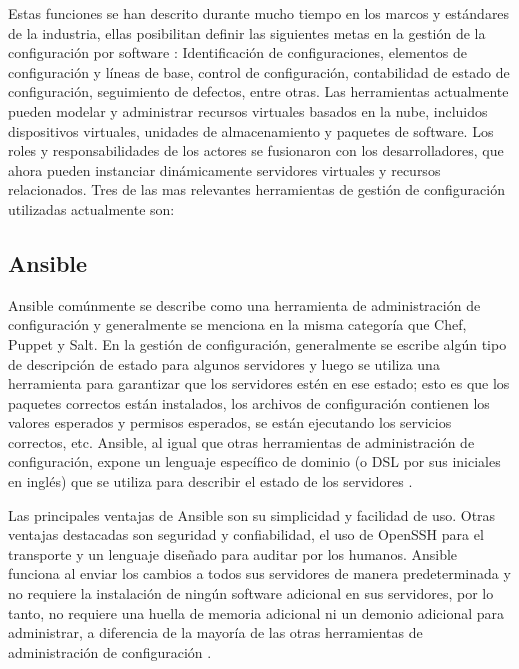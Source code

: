 \par Estas funciones se han descrito durante mucho tiempo en los marcos y estándares de la industria, ellas posibilitan definir las siguientes metas en la gestión de la configuración por software \cite{BOOK14}: Identificación de configuraciones, elementos de configuración y líneas de base, control de configuración, contabilidad de estado de configuración, seguimiento de defectos, entre otras. Las herramientas actualmente pueden modelar y administrar recursos virtuales basados en la nube, incluidos dispositivos virtuales, unidades de almacenamiento y paquetes de software. Los roles y responsabilidades de los actores se fusionaron con los desarrolladores, que ahora pueden instanciar dinámicamente servidores virtuales y recursos relacionados. Tres de las mas relevantes herramientas de gestión de configuración utilizadas actualmente son:
\subsection{Ansible}

\par Ansible comúnmente se describe como una herramienta de administración de configuración y generalmente se menciona en la misma categoría que Chef, Puppet y Salt. En la gestión de configuración, generalmente se escribe algún tipo de descripción de estado para algunos servidores y luego se utiliza una herramienta para garantizar que los servidores estén en ese estado; esto es que los paquetes correctos están instalados, los archivos de configuración contienen los valores esperados y permisos esperados, se están ejecutando los servicios correctos, etc. Ansible, al igual que otras herramientas de administración de configuración, expone un lenguaje específico de dominio (o DSL por sus iniciales en inglés) que se utiliza para describir el estado de los servidores \cite{BOOK13}.\\



\par Las principales ventajas de Ansible son su simplicidad y facilidad de uso. Otras ventajas destacadas son seguridad y  confiabilidad, el uso de OpenSSH para el transporte y un lenguaje diseñado para auditar por los humanos. Ansible funciona al enviar los cambios a todos sus servidores de manera predeterminada y no requiere la instalación de ningún software adicional en sus servidores, por lo tanto, no requiere una huella de memoria adicional ni un demonio adicional para administrar, a diferencia de la mayoría de las otras herramientas de administración de configuración \cite{BOOK13}.\\

